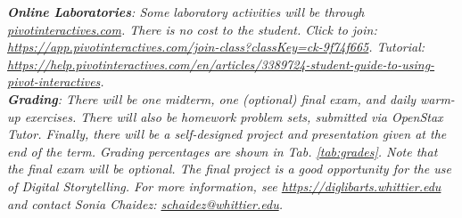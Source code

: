 \documentclass[10pt]{article}
\begin{document}
\textit{\textbf{Online Laboratories}: Some laboratory activities will be through \url{pivotinteractives.com}.  There is no cost to the student.  Click to join: \url{https://app.pivotinteractives.com/join-class?classKey=ck-9f74f665}. Tutorial: \url{https://help.pivotinteractives.com/en/articles/3389724-student-guide-to-using-pivot-interactives}.} \\
\textit{\textbf{Grading}: There will be one midterm, one (optional) final exam, and daily warm-up exercises.  There will also be homework problem sets, submitted via OpenStax Tutor.  Finally, there will be a self-designed project and presentation given at the end of the term.  Grading percentages are shown in Tab. \ref{tab:grades}.  \textit{Note that the final exam will be optional.} The final project is a good opportunity for the use of Digital Storytelling.  For more information, see \url{https://diglibarts.whittier.edu} and contact Sonia Chaidez: \url{schaidez@whittier.edu}. } \\
\end{document}
